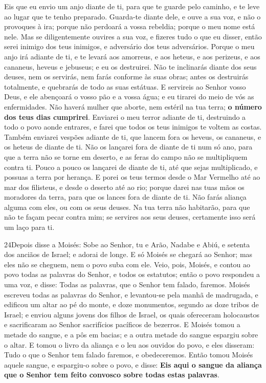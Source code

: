 Eis que eu envio um anjo diante de ti, para que te guarde pelo
caminho, e te leve ao lugar que te tenho preparado. Guarda-te
diante dele, e ouve a sua voz, e não o provoques à ira; porque não
perdoará a vossa rebeldia; porque o meu nome está nele. Mas
se diligentemente ouvires a sua voz, e fizeres tudo o que eu disser,
então serei inimigo dos teus inimigos, e adversário dos teus
adversários. Porque o meu anjo irá adiante de ti, e te levará
aos amorreus, e aos heteus, e aos perizeus, e aos cananeus, heveus e
jebuseus; e eu os destruirei. Não te inclinarás diante dos
seus deuses, nem os servirás, nem farás conforme às suas obras;
antes os destruirás totalmente, e quebrarás de todo as suas
estátuas. E servireis ao Senhor vosso Deus, e ele abençoará o
vosso pão e a vossa água; e eu tirarei do meio de vós as
enfermidades. Não haverá mulher que aborte, nem estéril na
tua terra; \textbf{o número dos teus dias cumprirei}.
Enviarei o meu terror adiante de ti, destruindo a todo o povo
aonde entrares, e farei que todos os teus inimigos te voltem as
costas. Também enviarei vespões adiante de ti, que lancem
fora os heveus, os cananeus, e os heteus de diante de ti. Não
os lançarei fora de diante de ti num só ano, para que a terra não se
torne em deserto, e as feras do campo não se multipliquem contra ti.
Pouco a pouco os lançarei de diante de ti, até que sejas
multiplicado, e possuas a terra por herança. E porei os teus
termos desde o Mar Vermelho até ao mar dos filisteus, e desde o
deserto até ao rio; porque darei nas tuas mãos os moradores da
terra, para que os lances fora de diante de ti. Não farás
aliança alguma com eles, ou com os seus deuses. Na tua terra
não habitarão, para que não te façam pecar contra mim; se servires
aos seus deuses, certamente isso será um laço para ti.

\medskip

\lettrine{24} Depois disse a Moisés: Sobe ao Senhor, tu e
Arão, Nadabe e Abiú, e setenta dos anciãos de Israel; e adorai de
longe. E só Moisés se chegará ao Senhor; mas eles não se
cheguem, nem o povo suba com ele. Veio, pois, Moisés, e contou
ao povo todas as palavras do Senhor, e todos os estatutos; então o
povo respondeu a uma voz, e disse: Todas as palavras, que o Senhor
tem falado, faremos. Moisés escreveu todas as palavras do
Senhor, e levantou-se pela manhã de madrugada, e edificou um altar
ao pé do monte, e doze monumentos, segundo as doze tribos de Israel;
e enviou alguns jovens dos filhos de Israel, os quais ofereceram
holocaustos e sacrificaram ao Senhor sacrifícios pacíficos de
bezerros. E Moisés tomou a metade do sangue, e a pôs em bacias;
e a outra metade do sangue espargiu sobre o altar. E tomou o
livro da aliança e o leu aos ouvidos do povo, e eles disseram: Tudo
o que o Senhor tem falado faremos, e obedeceremos. Então tomou
Moisés aquele sangue, e espargiu-o sobre o povo, e disse:
\textbf{Eis aqui o sangue da aliança que o Senhor tem feito convosco
sobre todas estas palavras}.

